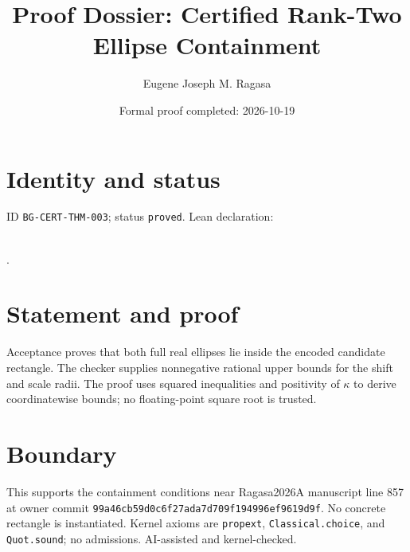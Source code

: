 \documentclass[11pt]{article}
\title{Proof Dossier: Certified Rank-Two Ellipse Containment}\author{Eugene Joseph M. Ragasa}\date{Formal proof completed: 2026-10-19}
\begin{document}
\maketitle
\section{Identity and status}
ID \texttt{BG-CERT-THM-003}; status \texttt{proved}. Lean declaration:
\par{}\\
{\tiny{}}.
\section{Statement and proof}
Acceptance proves that both full real ellipses lie inside the encoded candidate rectangle.
The checker supplies nonnegative rational upper bounds for the shift and scale radii. The
proof uses squared inequalities and positivity of $\kappa$ to derive coordinatewise bounds;
no floating-point square root is trusted.
\section{Boundary}
This supports the containment conditions near Ragasa2026A manuscript line 857 at owner
commit \texttt{99a46cb59d0c6f27ada7d709f194996ef9619d9f}. No concrete rectangle is
instantiated. Kernel axioms are \texttt{propext}, \texttt{Classical.choice}, and
\texttt{Quot.sound}; no admissions. AI-assisted and kernel-checked.
\end{document}
